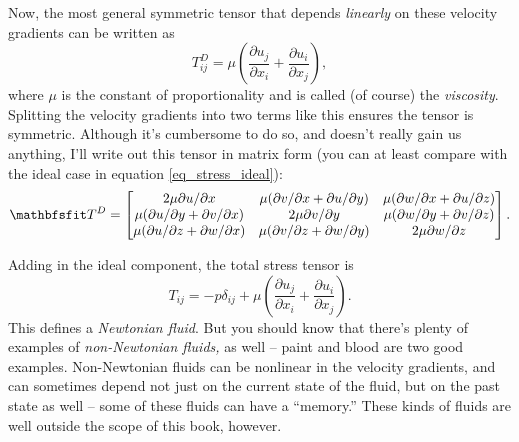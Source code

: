 Now, the most general symmetric tensor that depends \emph{linearly} on these velocity gradients can be written as
\begin{equation}
T_{ij}^D = \mu \left( \frac{\partial u_j}{\partial x_i} + \frac{\partial u_i}{\partial x_j} \right),
\end{equation}
where $\mu$ is the constant of proportionality and is called (of course) the \emph{viscosity}.  Splitting the velocity gradients into two terms like this ensures the tensor is symmetric.  Although it's cumbersome to do so, and doesn't really gain us anything, I'll write out this tensor in matrix form (you can at least compare with the ideal case in equation \ref{eq_stress_ideal}):
\[
\tens{T}^D = \begin{bmatrix}
2 \mu \partial u / \partial x  &  \mu (\partial v / \partial x + \partial u / \partial y)  &   \mu (\partial w / \partial x + \partial u / \partial z) \\
\mu (\partial u / \partial y + \partial v / \partial x)  & 2\mu  \partial v / \partial y  &  \mu (\partial w / \partial y + \partial v / \partial z) \\
\mu (\partial u / \partial z + \partial w / \partial x)  &  \mu (\partial v / \partial z + \partial w / \partial y) & 2\mu  \partial w / \partial z
\end{bmatrix}.
\label{eq_stress_newtonian}
\]

Adding in the ideal component, the total stress tensor is
\begin{equation}
\label{eq_stress_tensor}
\boxed{
T_{ij} = -p \delta_{ij} +  \mu \left( \frac{\partial u_j}{\partial x_i} + \frac{\partial u_i}{\partial x_j} \right).
}
\end{equation}
This defines a \emph{Newtonian fluid}.  But you should know that there's plenty of examples of \emph{non-Newtonian fluids,} as well -- paint and blood are two good examples.  Non-Newtonian fluids can be nonlinear in the velocity gradients, and can sometimes depend not just on the current state of the fluid, but on the past state as well -- some of these fluids can have a ``memory.''  These kinds of fluids are well outside the scope of this book, however.

